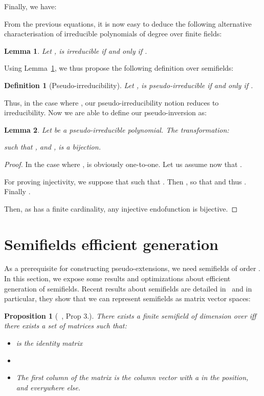 \documentclass{article}\usepackage{amsthm}
\newtheorem{mydef}{Definition}
\newtheorem{mylem}{Lemma}
\newtheorem{mypropo}{Proposition}
\begin{document}
Finally, we have:



From the previous equations, it is now easy to deduce the following alternative characterisation of irreducible polynomials of degree  over finite fields: 
\begin{mylem}\label{lem:charact}
Let ,  is irreducible if and only if .
\end{mylem}

Using Lemma~\ref{lem:charact}, we thus propose the following definition over semifields:
\begin{mydef}[Pseudo-irreducibility]\label{def:pseudoirred}
Let ,  is pseudo-irreducible if and only if .
\end{mydef} 

Thus, in the case where ,
our pseudo-irreducibility notion reduces to irreducibility. 
Now we are able to define our pseudo-inversion as:
\begin{mylem}\label{lem:pseudoinv}
Let  be a pseudo-irreducible polynomial. The transformation: 



such that , and , is a bijection.
\end{mylem}

\begin{proof}

In the case where ,  is obviously one-to-one.
Let us assume now that . 


For proving injectivity, we suppose that  such that .
Then , so that  and thus . Finally .

Then, as  has a finite cardinality, any injective endofunction 
is bijective.
\end{proof}


\section{Semifields efficient generation}\label{sec:gener}
As a prerequisite for constructing pseudo-extensions, we need semifields of order . In this section, we expose some results and optimizations about efficient generation of semifields.
Recent results about semifields are detailed in~\cite{Combarro:2011:advances_sf} and in particular, they  show that we can represent semifields as matrix vector spaces:


\begin{mypropo}[~\cite{Combarro:2011:advances_sf}, Prop 3.]
There exists a finite semifield  of dimension  over  iff there exists a set of  matrices   such that: 
\begin{itemize}
\item  is the identity matrix
\item  
\item The first column of the matrix  is the column vector with a  in the  position, and  everywhere else.\\
\end{itemize}
\end{mypropo}
\end{document}
